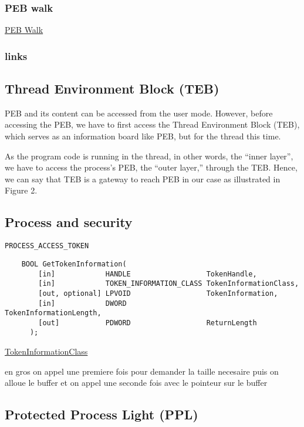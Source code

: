 \subsubsection{PEB walk}

\href{https://fareedfauzi.github.io/2024/07/13/PEB-Walk.html}{PEB Walk}

\subsubsection{links}


\subsection{Thread Environment Block (TEB)}

PEB and its content can be accessed from the user mode. However, before accessing the PEB, we have to first access the Thread Environment Block (TEB), which serves as an information board like PEB, but for the thread this time.

As the program code is running in the thread, in other words, the “inner layer”, we have to access the process’s PEB, the “outer layer,” through the TEB. Hence, we can say that TEB is a gateway to reach PEB in our case as illustrated in Figure 2.

\subsection{Process and security}

\verb+PROCESS_ACCESS_TOKEN+

\begin{verbatim}
    BOOL GetTokenInformation(
        [in]            HANDLE                  TokenHandle,
        [in]            TOKEN_INFORMATION_CLASS TokenInformationClass,
        [out, optional] LPVOID                  TokenInformation,
        [in]            DWORD                   TokenInformationLength,
        [out]           PDWORD                  ReturnLength
      );
\end{verbatim}

\href{https://learn.microsoft.com/fr-fr/windows/win32/api/winnt/ne-winnt-token_information_class}{TokenInformationClass}

en gros on appel une premiere fois pour demander la taille necesaire puis on alloue le buffer et on appel une seconde fois avec le pointeur sur le buffer


\subsection{Protected Process Light (PPL)}